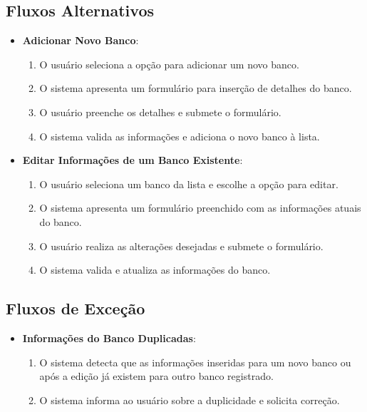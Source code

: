 \subsection*{Fluxos Alternativos}
\begin{addmargin}[1.5cm]{0cm}
	\begin{itemize}
		\item \textbf{Adicionar Novo Banco}:
		      \begin{enumerate}
			      \item O usuário seleciona a opção para adicionar um novo banco.
			      \item O sistema apresenta um formulário para inserção de detalhes do banco.
			      \item O usuário preenche os detalhes e submete o formulário.
			      \item O sistema valida as informações e adiciona o novo banco à lista.
		      \end{enumerate}

		\item \textbf{Editar Informações de um Banco Existente}:
		      \begin{enumerate}
			      \item O usuário seleciona um banco da lista e escolhe a opção para editar.
			      \item O sistema apresenta um formulário preenchido com as informações atuais do banco.
			      \item O usuário realiza as alterações desejadas e submete o formulário.
			      \item O sistema valida e atualiza as informações do banco.
		      \end{enumerate}
	\end{itemize}
\end{addmargin}

\subsection*{Fluxos de Exceção}
\begin{addmargin}[1.5cm]{0cm}
	\begin{itemize}
		\item \textbf{Informações do Banco Duplicadas}:
		      \begin{enumerate}
			      \item O sistema detecta que as informações inseridas para um novo banco ou após a edição já existem para outro banco registrado.
			      \item O sistema informa ao usuário sobre a duplicidade e solicita correção.
		      \end{enumerate}
	\end{itemize}
\end{addmargin}


